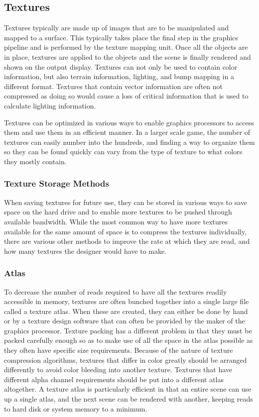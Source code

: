 \documentclass[12pt]{article}
\begin{document}
\subsection{Textures}
Textures typically are made up of images that are to be manipulated and mapped to a surface. This typically takes place the final step in the graphics pipeline and is performed by the texture mapping unit. Once all the objects are in place, textures are applied to the objects and the scene is finally rendered and shown on the output display. Textures can not only be used to contain color information, but also terrain information, lighting, and bump mapping in a different format. Textures that contain vector information are often not compressed as doing so would cause a loss of critical information that is used to calculate lighting information.

Textures can be optimized in various ways to enable graphics processors to access them and use them in an efficient manner. In a larger scale game, the number of textures can easily number into the hundreds, and finding a way to organize them so they can be found quickly can vary from the type of texture to what colors they mostly contain.

\subsubsection{Texture Storage Methods}
When saving textures for future use, they can be stored in various ways to save space on the hard drive and to enable more textures to be pushed through available bandwidth. While the most common way to have more textures available for the same amount of space is to compress the textures individually, there are various other methods to improve the rate at which they are read, and how many textures the designer would have to make.

\subsubsection{Atlas}
To decrease the number of reads required to have all the textures readily accessible in memory, textures are often bunched together into a single large file called a texture atlas. When these are created, they can either be done by hand or by a texture design software that can often be provided by the maker of the graphics processor. Texture packing has a different problem in that they must be packed carefully enough so as to make use of all the space in the atlas possible as they often have specific size requirements. Because of the nature of texture compression algorithms, textures that differ in color greatly should be arranged differently to avoid color bleeding into another texture. Textures that have different alpha channel requirements should be put into a different atlas altogether. A texture atlas is particularly efficient in that an entire scene can use up a single atlas, and the next scene can be rendered with another, keeping reads to hard disk or system memory to a minimum. \citep{Sherrod2008}
\end{document}
